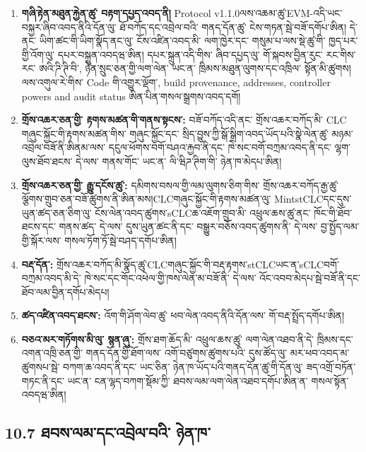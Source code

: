 \documentclass[11pt]{article}
\begin{document}
\begin{enumerate}[leftmargin=*]
\item \textbf{གཞི་རྟེན་མཐུན་རྐྱེན་ཚུ་ བརྟག་དཔྱད་འབད་ནི།} Protocol v1.1.0ལས་འཆམ་ཚུ་EVM-འདི་ཡང་ བསྐྱར་ཞིབ་འབད་ནིའི་དོན་ལུ་ ཐོ་བཀོད་དང་འབྲེལ་བའི་ གནད་དོན་ཚུ་ ངེས་གཏན་སྦེ་བཟོ་དགོཔ་ཨིན། དེ་ནང་ ཡིག་ཚང་གི་ཡིག་སྣོད་ནང་ལུ་ ངོས་འཛིན་འབད་མི་ ལག་ཁྱེར་དང་ གསུམ་པ་ལས་སྡེ་ཚུ་གི་ ཁྱད་པར་གྱི་འོག་ལུ་ དཔར་བསྐྲུན་འབདཝ་ཨིན། དཔར་སྐྲུན་འདི་གིས་ ཞིབ་དཔྱད་ལུ་ གོ་སྐབས་བྱིན་རུང་ རང་གིས་རང་ ཨའི་ཌི་ཊི་བི་, ཉེན་སྲུང་ཅན་གྱི་ལག་ལེན་ ཡང་ན་ ཁྲིམས་མཐུན་ལུགས་དང་འཁྲིལ་ སྟོན་མི་ཚུགས། ལས་འགུལ་རེ་གིས་ Code གི་འགྱུར་ལྡོག་, build provenance, addresses, controller powers and audit status ཨིན་པིན་གསལ་སྒྲགས་འབད་དགོ།
\item \textbf{གྲོས་འཆར་ཅན་གྱི་ རྟགས་མཚན་གི་གནས་སྟངས་:} བཟོ་བཀོད་འདི་ནང་ གྲོས་འཆར་བཀོད་མི་ CLC གཞུང་སྐྱོང་གི་རྟགས་མཚན་གིས་ གཞུང་སྐྱོང་དང་ སྲིད་བྱུས་ཀྱི་སྒོ་སྒྲིག་འབད་ཡོད་པའི་སྣེ་ལེན་ཚུ་ མཉམ་འབྲེལ་བཟོ་ནི་ཨིནམ་ལས་ དངུལ་ཕོགས་བགོ་བཤའ་རྐྱབ་ནི་དང་ ཁེ་སང་བགོ་བཀྲམ་འབད་ནི་དང་ ལྷག་ལུས་ཐོབ་ཐངས་ དེ་ལས་ གནས་གོང་ ཡང་ན་ ལི་ཝིཌ་ཊིག་གི་ ཉེན་ཁ་མེདཔ་ཨིན།
\item \textbf{གྲོས་འཆར་ཅན་གྱི་ རྒྱུ་དངོས་ཚུ་:} དམིགས་བསལ་གྱི་ལམ་ལུགས་ཅིག་གིས་ གྲོས་འཆར་བཀོད་རྒྱ་ཚུ་ ལྕོགས་གྲུབ་ཅན་བཟོ་ཚུགས་ནི་ཨིན་མས།CLCགཞུང་སྐྱོང་གི་རྟགས་མཚན་ལུ་ MintstCLCདང་དུས་ཡུན་ཚད་ཅན་ཅིག་ལུ་ ངོས་ལེན་འབད་ཚུགས་sCLCཆ་འཇོག་གྲུབ་མི་ འཕྲུལ་ཆས་ཚུ་ནང་ ཁོང་གི་ཐོབ་ཐངས་དང་ གནས་ཚད་ དེ་ལས་ དུས་ཡུན་ཚང་ནི་དང་ བསྒྱུར་བཅོས་འབད་ཚུགས་ནི་ དེ་ལས་ བྱ་སྤྱོད་ལམ་གྱི་སྐོར་ལས་ གསལ་ཏོག་ཏོ་སྦེ་བཤད་དགོཔ་ཨིན།
\item \textbf{བརྡ་དོན་:} གྲོས་འཆར་བཀོད་མི་སྣོད་ཚུ་CLCགཞུང་སྐྱོང་གི་བརྡ་རྟགས་stCLCཡང་ན་sCLCབགོ་བཀྲམ་འབད་མི་དེ་ ཁེ་སང་དང་གོང་འཕེལ་གྱི་ཁས་ལེན་མ་བཟོ་ནི་ དེ་ལས་ འོང་འབབ་མེདཔ་སྦེ་བཟོ་ནི་དང་ ཐོབ་ལམ་བྱིན་དགོཔ་མེདཔ།
\item \textbf{ཚད་འཛིན་འབད་ཐངས་:} འོག་གི་ཤོག་ལེབ་ཚུ་ ཕབ་ལེན་འབད་ནིའི་དོན་ལས་ གོ་བརྡ་སྤྲོད་དགོཔ་ཨིན།
\item \textbf{བཅའ་མར་གཏོགས་མི་ལུ་ སྙན་ཞུ་:} གྲོས་ཐག་ཆོད་མི་ འཕྲུལ་ཆས་ཚུ་ ལག་ལེན་འཐབ་ནི་དེ་ ཁྲིམས་དང་ འགན་འཁྲི་ཅན་གྱི་ གནད་དོན་གྱི་ཐོག་ལས་ འགོ་བཙུགས་ཚུགས་པའི་ དུས་ཚོད་ལུ་ མར་ཕབ་འབད་མ་ཚུགསཔ་སྦེ་ བཀག་ཆ་འབད་ནི་དང་ ཡང་ཅིན་ ཉེན་ཁ་ཡོད་པའི་གནད་དོན་ཚུ་གི་དོན་ལུ་ ཟད་འགྲོ་བཏོན་གཏང་ནི་དང་ ཡང་ན་ ངན་ལྷད་བཀག་སྡོམ་ཀྱི་ ཐབས་ལམ་ལག་ལེན་འཐབ་དགོཔ་ཨིན་ན་ གསལ་སྟོན་འབདཝ་ཨིན།
\end{enumerate}
\subsection*{10.7 ཐབས་ལམ་དང་འབྲེལ་བའི་ ཉེན་ཁ་}
\end{document}
